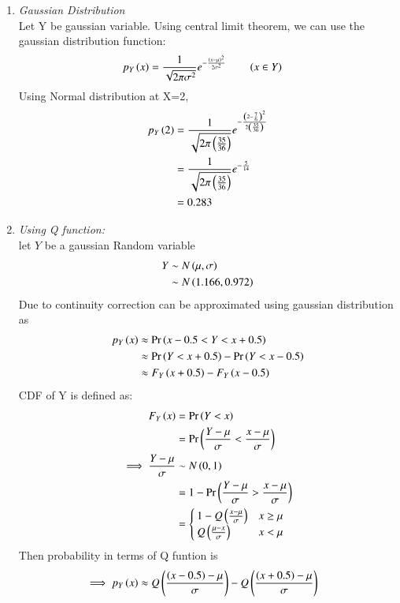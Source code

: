 \documentclass[journal,12pt,onecolumn]{IEEEtran}
\theoremstyle{remark}
\begin{document}
\begin{enumerate}
             \item{ \em{Gaussian Distribution}}\\
             Let Y be gaussian variable. Using central limit theorem, we can use the gaussian distribution function:
\begin{align}
p_Y\brak{x} &= \frac{1}{\sqrt{2\pi{\sigma}^2}} e^{-\frac{\brak{x-\mu}^2}{2{\sigma}^2}}\label{9.3.21.a} \qquad \brak{x \in Y}
\end{align}
Using Normal distribution at X=2,
\begin{align}
p_Y\brak{2} &= \frac{1}{\sqrt{2\pi \brak{\frac{35}{36}}}} e^{-\frac{\brak{2-\frac{7}{6}}^2}{2 \brak{\frac{35}{36}}}}\label{9.3.21.b} \\
&= \frac{1}{\sqrt{2\pi \brak{\frac{35}{36}}}} e^{-\frac{5}{14}}\\
&=0.283
\end{align}
\item {\em{Using Q function:}}\\
let $Y$ be a gaussian Random variable
\begin{align}
	Y &\sim N\left(\mu,\sigma\right)\\
	&\sim N\left(1.166,0.972\right)
\end{align}
Due to continuity correction  can be approximated using gaussian distribution as
\begin{align}
	p_Y\left(x\right)&\approx\Pr\left(x-0.5<Y<x+0.5\right)\\
	&\approx\Pr\left(Y<x+0.5\right)-\Pr\left(Y<x-0.5\right)	\\
	&\approx F_Y\left(x+0.5\right)-F_Y\left(x-0.5\right)
\end{align}
CDF of Y is defined as:
\begin{align}
	F_Y\left(x\right)&=\Pr\left(Y<x\right)\\
	&=\Pr\left(\frac{Y-\mu}{\sigma}<\frac{x-\mu}{\sigma}\right)\\
	\implies \frac{Y-\mu}{\sigma} &\sim N\left(0,1\right)\\
	&=1-\Pr\left(\frac{Y-\mu}{\sigma}>\frac{x-\mu}{\sigma}\right)\\
	&=\begin{cases}
		1-Q\left(\frac{x-\mu}{\sigma}\right) & x \geq \mu\\
		Q\left(\frac{\mu -x}{\sigma}\right) & x < \mu 
	\end{cases}
\end{align}
Then probability in terms of Q funtion is
\begin{align}
	\implies p_Y\left(x\right)&\approx Q\left(\frac{\left(x-0.5\right)-\mu}{\sigma}\right)-Q\left(\frac{\left(x+0.5\right)-\mu}{\sigma}\right)
\end{align}


\end{enumerate}
\end{document}
